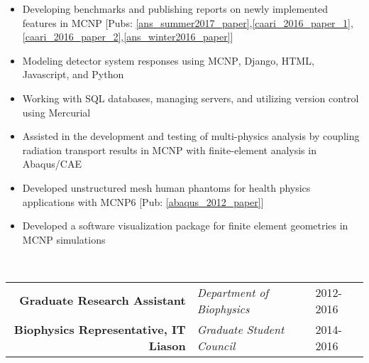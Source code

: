 \begin{minipage}{\textwidth}
    \begin{center}
	\begin{itemize}
		\item Developing benchmarks and publishing reports on newly implemented features in MCNP [Pubs: \ref{ans_summer2017_paper},\ref{caari_2016_paper_1},\ref{caari_2016_paper_2},\ref{ans_winter2016_paper}] %
	 	\item Modeling detector system responses using \textsc{MCNP}, Django, HTML, Javascript, and Python
		\item Working with SQL databases, managing servers, and utilizing version control using Mercurial
		\item Assisted in the development and testing of multi-physics analysis by coupling radiation 
			transport results in \textsc{MCNP} with finite-element analysis in Abaqus/CAE 
	        \item Developed unstructured mesh human phantoms for health physics applications with \textsc{MCNP6} [Pub: \ref{abaqus_2012_paper}]
	        \item Developed a software visualization package for finite element geometries in MCNP simulations
	\end{itemize}
    \end{center}
\end{minipage}

\\

\begin{minipage}{\textwidth}
	\begin{center}
		\begin{tabular}{rll}
			\textbf{Graduate Research Assistant} & \textit{Department of Biophysics} & 2012-2016 \\
			\textbf{Biophysics Representative, IT Liason} & \textit{Graduate Student Council} & 2014-2016 \\
		\end{tabular}
	\end{center}
\end{minipage}%

